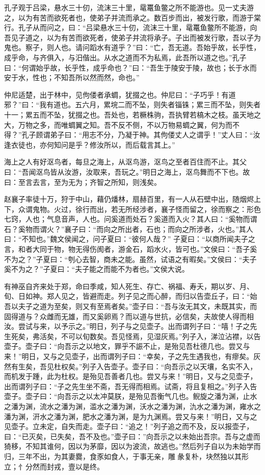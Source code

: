 \documentclass[]{article}
\begin{document}
孔子观于吕梁，悬水三十仞，流沫三十里，鼋鼍鱼鳖之所不能游也。见一丈夫游之，以为有苦而欲死者也，使弟子并流而承之。数百步而出，被发行歌，而游于棠行。孔子从而问之，曰：``吕梁悬水三十仞，流沫三十里，鼋鼍鱼鳖所不能游，向吾见子道之，以为有苦而欲死者，使弟子并流将承子。子出而被发行歌，吾以子为鬼也。察子，则人也。请问蹈水有道乎？''曰：``亡，吾无道。吾始乎故，长乎性，成乎命，与齐俱入，与汨偕出。从水之道而不为私焉，此吾所以道之也。''孔子曰：``何谓始乎故，长乎性，成乎命也？''曰：``吾生于陵安于陵，故也；长于水而安于水，性也；不知吾所以然而然，命也。''

仲尼适楚，出于林中，见佝偻者承蜩，犹掇之也。仲尼曰：``子巧乎！有道邪？''曰：``我有道也。五六月，累垸二而不坠，则失者锱铢；累三而不坠，则失者十一；累五而不坠，犹掇之也。吾处也，若橛株驹，吾执臂若槁木之枝。虽天地之大，万物之多，而唯蜩翼之知。吾不反不侧，不以万物易蜩之翼，何为而不得？''孔子顾谓弟子曰：``用志不分，乃凝于神。其佝偻丈人之谓乎！''丈人曰：``汝逢衣徒也，亦何知问是乎？修汝所以，而后载言其上。''

海上之人有好沤鸟者，每旦之海上，从沤鸟游，沤鸟之至者百住而不止。其父曰：``吾闻沤鸟皆从汝游，汝取来，吾玩之。''明日之海上，沤鸟舞而不下也。故曰：至言去言，至为无为；齐智之所知，则浅矣。

赵襄子率徒十万，狩于中山，藉仍燔林，扇赫百里，有一人从石壁中出，随烟烬上下，众谓鬼物。火过，徐行而出，若无所经涉者，襄子怪而留之，徐而察之：形色七窍，人也；气息音声，人也。问奚道而处石？奚道而入火？其人曰：``奚物而谓石？奚物而谓火？''襄子曰：``而向之所出者，石也；而向之所涉者，火也。''其人曰：``不知也。''魏文侯闻之，问子夏曰：``彼何人哉？''
子夏曰：``以商所闻夫子之言，和者大同于物，物无得伤阂者，游金石，蹈水火，皆可也。''文侯曰：``吾子奚不为之？''子夏曰：``刳心去智，商未之能。虽然，试语之有暇矣。''文侯曰：``夫子奚不为之？''子夏曰：``夫子能之而能不为者也。''文侯大说。

有神巫自齐来处于郑，命曰季咸，知人死生、存亡、祸福、寿夭，期以岁、月、旬、日如神。郑人见之，皆避而走。列子见之而心醉，而归以告壶丘子，曰：``始吾以夫子之道为至矣，则又有至焉者矣。''壶子曰：``吾与汝无其文，未既其实，而固得道与？众雌而无雄，而又奚卵焉？而以道与世抗，必信矣，夫故使人得而相汝。尝试与来，以予示之。''明日，列子与之见壶子。出而谓列子曰：``嘻！子之先生死矣，弗活矣，不可以旬数矣。吾见怪焉，见湿灰焉。''列子入，涕泣沾襟，以告壶子。壶子曰：``向吾示之以地文，罪乎不誫不止，是殆见吾杜德几也。尝又与来！''明日，又与之见壶子，出而谓列子曰：``幸矣，子之先生遇我也，有瘳矣。灰然有生矣，吾见杜权矣。''列子入告壶子。壶子曰：``向吾示之以天壤，名实不入，而机发于踵，此为杜权。是殆见吾善者几也。尝又与来！''明日，又与之见壶子，出而谓列子曰：``子之先生坐不斋，吾无得而相焉。试斋，将且复相之。''列子入告壶子。壶子曰：``向吾示之以太冲莫朕，是殆见吾衡气几也。鲵旋之潘为渊，止水之潘为渊，流水之潘为渊，滥水之潘为渊，沃水之潘为渊，氿水之潘为渊，雍水之潘为渊，汧水之潘为渊，肥水之潘为渊，是为九渊焉。尝又与来！''明日，又与之见壶子。立未定，自失而走。壶子曰：``追之！''列子追之而不及，反以报壶子，曰：``已灭矣，已失矣，吾不及也。''壶子曰：''向吾示之以未始出吾宗。吾与之虚而猗移，不知其谁何，因以为茅靡，因以为波流，故逃也。''然后列子自以为未始学而归，三年不出，为其妻爨，食豕如食人，于事无亲，雕彖复朴，块然独以其形立；忄分然而封戎，壹以是终。
\end{document}
